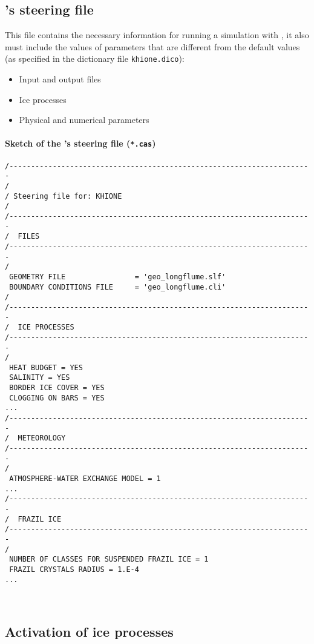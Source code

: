 \subsection{\khione's steering file}
This file contains the necessary information for running a simulation with \khione, it also must include the values of parameters that are different from the default values (as specified in the dictionary file \texttt{khione.dico}):
\begin{itemize}
\item Input and output files
\item Ice processes
\item Physical and numerical parameters
\end{itemize}

\paragraph{Sketch of the \khione's steering file (\texttt{*.cas})}

\lstset{language=TelemacCas,
        basicstyle=\scriptsize\ttfamily}
\begin{lstlisting}
/----------------------------------------------------------------------
/
/ Steering file for: KHIONE
/
/----------------------------------------------------------------------
/  FILES
/----------------------------------------------------------------------
/
 GEOMETRY FILE                = 'geo_longflume.slf'
 BOUNDARY CONDITIONS FILE     = 'geo_longflume.cli'
/
/----------------------------------------------------------------------
/  ICE PROCESSES
/----------------------------------------------------------------------
/
 HEAT BUDGET = YES
 SALINITY = YES
 BORDER ICE COVER = YES
 CLOGGING ON BARS = YES
...
/----------------------------------------------------------------------
/  METEOROLOGY
/----------------------------------------------------------------------
/
 ATMOSPHERE-WATER EXCHANGE MODEL = 1
...
/----------------------------------------------------------------------
/  FRAZIL ICE
/----------------------------------------------------------------------
/
 NUMBER OF CLASSES FOR SUSPENDED FRAZIL ICE = 1
 FRAZIL CRYSTALS RADIUS = 1.E-4
...
\end{lstlisting}

~\newline
\subsection{Activation of ice processes}
\label{ice_processes_activation}

